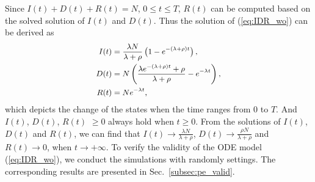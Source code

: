 Since $I(t)+D(t)+R(t)=N$, $0 \le t \le T$,
$R(t)$ can be computed based on
the solved solution of $I(t)$ and $D(t)$.
Thus the solution of (\ref{eq:IDR_wo}) can be derived as
\begin{equation}
\begin{small}
\label{eq:IDR_wo_solu}
\begin{aligned}
I(t) &= \frac{ \lambda N }{ \lambda + \rho }
\left( 1- e^{-(\lambda + \rho)t} \right), \\
D(t) &= N \left( \frac{\lambda e^{-(\lambda + \rho)t} + \rho}
{ \lambda + \rho } - e^{- \lambda t} \right), \\
R(t) &= N e^{- \lambda t},
\end{aligned}
\end{small}
\end{equation}
which depicts the change of the states
when the time ranges from $0$ to $T$.
And $I(t)$, $D(t)$, $R(t)$ $\ge 0$ always hold
when $t \ge 0$.
From the solutions of $I(t)$, $D(t)$ and $R(t)$,
we can find that $I(t) \rightarrow \frac{ \lambda N }
{ \lambda + \rho }$,
$D(t) \rightarrow \frac{ \rho N }{ \lambda + \rho }$
and $R(t) \rightarrow 0$,
when $t \rightarrow + \infty$.
To verify the validity of the ODE model (\ref{eq:IDR_wo}),
we conduct the simulations with randomly settings.
The corresponding results are presented in
Sec.~\ref{subsec:pe_valid}.

